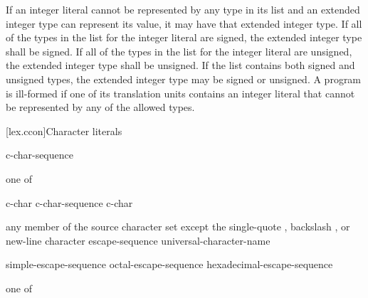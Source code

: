 \pnum
If an integer literal cannot be represented by any type in its list and
an extended integer type can represent its value, it may have that
extended integer type. If all of the types in the list for the integer literal
are signed, the extended integer type shall be signed. If all of the
types in the list for the integer literal are unsigned, the extended integer
type shall be unsigned. If the list contains both signed and unsigned
types, the extended integer type may be signed or unsigned. A program is
ill-formed if one of its translation units contains an integer literal
that cannot be represented by any of the allowed types.

[lex.ccon]{Character literals}

%
\begin{bnf}
\br
      c-char-sequence 
\end{bnf}

\begin{bnf}
 \textnormal{one of}\br
    \quad{}\quad{}\quad{}
\end{bnf}

\begin{bnf}
\br
    c-char\br
    c-char-sequence c-char
\end{bnf}

\begin{bnf}
\br
    \textnormal{any member of the source character set except the single-quote , backslash \terminal{\textbackslash}, or new-line character}\br
    escape-sequence\br
    universal-character-name
\end{bnf}

\begin{bnf}
\br
    simple-escape-sequence\br
    octal-escape-sequence\br
    hexadecimal-escape-sequence
\end{bnf}

\begin{bnf}
 \textnormal{one of}\br
    \quad{}\quad{}\quad\terminal{\textbackslash\textbackslash}\br
    \quad{}\quad{}\quad{}\quad{}\quad{}\quad{}
\end{bnf}

